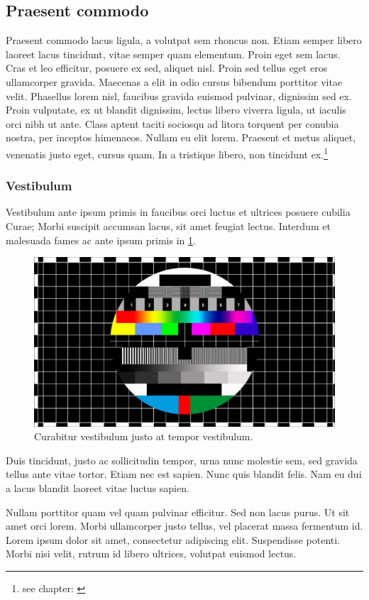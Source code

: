 \subsection{Praesent commodo}\label{subsec:PraesentCommodo}
Praesent commodo lacus ligula, a volutpat sem rhoncus non. Etiam semper libero laoreet lacus tincidunt, vitae semper quam elementum. Proin eget sem lacus. Cras et leo efficitur, posuere ex sed, aliquet nisl. Proin sed tellus eget eros ullamcorper gravida. Maecenas a elit in odio cursus bibendum porttitor vitae velit. Phasellus lorem nisl, faucibus gravida euismod pulvinar, dignissim sed ex. Proin vulputate, ex ut blandit dignissim, lectus libero viverra ligula, ut iaculis orci nibh ut ante. Class aptent taciti sociosqu ad litora torquent per conubia nostra, per inceptos himenaeos. Nullam eu elit lorem. Praesent et metus aliquet, venenatis justo eget, cursus quam. In a tristique libero, non tincidunt ex.\footnote{see chapter:  \label{foot:Fuß1}}

\subsubsection{Vestibulum}\label{subsubsec:Vestibulum}
Vestibulum ante ipsum primis in faucibus orci luctus et ultrices posuere cubilia Curae; Morbi suscipit accumsan lacus, sit amet feugiat lectus. Interdum et malesuada fames ac ante ipsum primis in \ref{fig:TestImage}. 

\begin{figure}[htbp]
\centering
\includegraphics[scale=0.3]{Abbildungen/TestImage.jpg}
\caption{Curabitur vestibulum justo at tempor vestibulum.}
\label{fig:TestImage}
\end{figure}

Duis tincidunt, justo ac sollicitudin tempor, urna nunc molestie sem, sed gravida tellus ante vitae tortor. Etiam nec est sapien. Nunc quis blandit felis. Nam eu dui a lacus blandit laoreet vitae luctus sapien. 

Nullam porttitor quam vel quam pulvinar efficitur. Sed non lacus purus. Ut sit amet orci lorem. Morbi ullamcorper justo tellus, vel placerat massa fermentum id. Lorem ipsum dolor sit amet, consectetur adipiscing elit. Suspendisse potenti. Morbi nisi velit, rutrum id libero ultrices, volutpat euismod lectus.\cite[S. 1030]{Morbiac.20.02.1500}